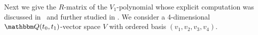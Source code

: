 \documentclass[12pt,reqno]{amsart}
\theoremstyle{definition}
\def\BQ{\mathbbm Q}
\def\be{\begin{equation}}
\def\ee{\end{equation}}
\def\End{\mathrm{End}}
\begin{document}
Next we give the $R$-matrix of the $V_1$-polynomial whose explicit computation was
discussed in~\cite{GK:multi} and further studied in \cite{GHKST}. We consider a
4-dimensional $\BQ(t_0,t_1)$-vector space $V$ with ordered
basis $(v_1,v_2,v_3,v_4)$.
\end{document}
